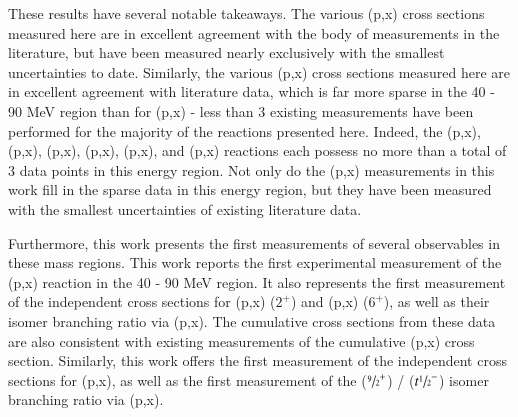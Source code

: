 \documentclass[3p]{elsarticle}
\begin{document}
These results have several notable takeaways.
The various (p,x) cross sections measured here are in excellent agreement with the body of measurements in the literature,  but have been measured nearly exclusively with the smallest uncertainties to date.
Similarly, the various (p,x) cross sections measured here are in excellent agreement with literature data, which is far more sparse in the 40 - 90 MeV region than for (p,x) -  less than 3 existing measurements have been performed for the majority of the reactions presented here.
Indeed,  the (p,x), (p,x), (p,x), (p,x), (p,x), and (p,x) reactions each possess no more than a total of 3 data points in this energy region.
Not only do the (p,x) measurements in this work fill in the sparse data in this energy region, but they have been measured with the smallest uncertainties of existing literature data.



Furthermore, this work presents the first measurements of several observables in these mass regions.
This work reports the first experimental measurement of the (p,x) reaction in the 40 - 90 MeV region.
It also represents  the first measurement of the independent cross sections for    (p,x) ($2^+$) and  (p,x)  ($6^+$), as well as their  isomer branching ratio via (p,x).  
The cumulative cross sections from these data are also consistent with existing measurements of the cumulative (p,x) cross section.
Similarly, this work offers the first measurement of the independent cross sections for (p,x),  as well as the first measurement of the      ($\sfrac{9}{2}^+$) /   ($t\sfrac{1}{2}^-$) isomer branching ratio via (p,x).
\end{document}
